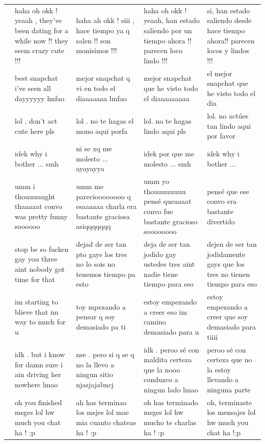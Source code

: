 \documentclass[11pt]{article}
\begin{document}
{\begin{longtable}{c p{3.3cm} p{3.3cm} p{3.3cm} p{3.3cm}}
  \addlinespace
  22 & haha oh okk ! yeaah , they've been dating for a while now !! they seem crazy cute !!! & haha ah okk ! siii , hace tiempo ya q salen !! son monisimos !!! & haha oh okk ! yeaah, han estado saliendo por un tiempo ahora !! parecen loco lindo !!! & si, han estado saliendo desde hace tiempo ahora!! parecen locos y lindos !!! \\
  \addlinespace
  23 & best snapchat i've seen all dayyyyyy lmfao & mejor snapchat q vi en todo el diaaaaaaa lmfao & mejor snapchat que he visto todo el diaaaaaaaaa & el mejor snapchat que he visto todo el dia \\
  \addlinespace
  24 & lol . don't act cute here pls & lol . no te hagas el mono aqui porfa & lol. no te hagas lindo aqui pls & lol. no actúes tan lindo aqui por favor \\
  \addlinespace
  25 & idek why i bother ... smh & ni se xq me molesto ... ayayayya & idek por que me molesto ... smh & idek why i bother ... \\
  \addlinespace
  26 & umm i thouuuuught thaaaaat convo was pretty funny soooooo & umm me parecioooooooo q esaaaaaa charla era bastante graciosa asiqqqqqqq & umm yo thouuuuuuuu pensé queaaaat convo fue bastante gracioso soooooooo & pensé que ese convo era bastante divertido \\
  \addlinespace
  27 & stop be so fucken gay you three aint nobody got time for that & dejad de ser tan pto gays los tres no lo sois no tenemos tiempo pa esto & deja de ser tan jodido gay ustedes tres aint nadie tiene tiempo para eso & dejen de ser tan jodidamente gays que los tres no tienen tiempo para eso \\
  \addlinespace
  28 & im starting to blieve that im way to much for u & toy mpezando a pensar q soy demasiado pa ti & estoy empezando a creer eso im camino demasiado para u & estoy empezando a creer que soy demasiado para tiiii \\
  \addlinespace
  29 & idk . but i know for damn sure i ain driving her nowhere lmao & nse . pero si q se q no la llevo a ningun sitio njasjajabncj & idk . peroo sé con maldita certeza que la nooo conduzco a ningun lado lmao & peroo sé con certeza que no la estoy llevando a ninguna parte \\
  \addlinespace
  30 & oh you finished msges lol hw much you chat ha ! :p & ah has terminao los msjes lol mae mia cuanto chateas ha ! :p & oh has terminado msges lol hw mucho te charlas ha ! :p & oh, terminaste los mensajes lol hw much you chat ha !:p \\

\end{longtable}}
\end{document}

